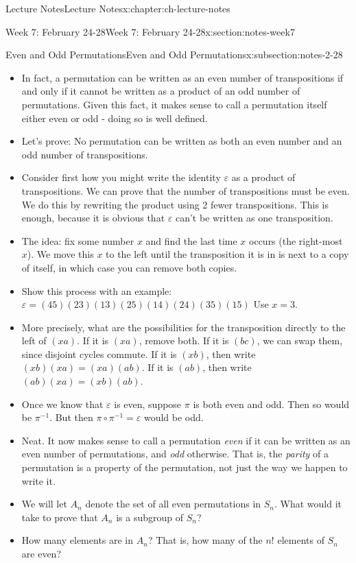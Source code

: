 \documentclass[oneside,11pt,]{book}
\begin{document}
\begin{chapterptx}{Lecture Notes}{}{Lecture Notes}{}{}{x:chapter:ch-lecture-notes}
\begin{sectionptx}{Week 7: February 24-28}{}{Week 7: February 24-28}{}{}{x:section:notes-week7}
\begin{subsectionptx}{Even and Odd Permutations}{}{Even and Odd Permutations}{}{}{x:subsection:notes-2-28}
\begin{itemize}[label=\textbullet]
\item{}In fact, a permutation can be written as an even number of transpositions if and only if it cannot be written as a product of an odd number of permutations. Given this fact, it makes sense to call a permutation itself either even or odd - doing so is well defined.%
\item{}Let’s prove: No permutation can be written as both an even number and an odd number of transpositions.%
\item{}Consider first how you might write the identity \(\varepsilon\) as a product of transpositions. We can prove that the number of transpositions must be even. We do this by rewriting the product using 2 fewer transpositions. This is enough, because it is obvious that \(\varepsilon\) can’t be written as one transposition.%
\item{}The idea: fix some number \(x\) and find the last time \(x\) occurs (the right-most \(x\)). We move this \(x\) to the left until the transposition it is in is next to a copy of itself, in which case you can remove both copies.%
\item{}Show this process with an example: \(\varepsilon = (45)(23)(13)(25)(14)(24)(35)(15)\) Use \(x = 3\).%
\item{}More precisely, what are the possibilities for the transposition directly to the left of \((xa)\). If it is \((xa)\), remove both. If it is \((bc)\), we can swap them, since disjoint cycles commute. If it is \((xb)\), then write \((xb)(xa) = (xa)(ab)\). If it is \((ab)\), then write \((ab)(xa) = (xb)(ab)\).%
\item{}Once we know that \(\varepsilon\) is even, suppose \(\pi\) is both even and odd. Then so would be \(\pi^{-1}\). But then \(\pi\circ \pi^{-1}= \varepsilon\) would be odd.%
\item{}Neat. It now makes sense to call a permutation \emph{even} if it can be written as an even number of permutations, and \emph{odd} otherwise. That is, the \emph{parity} of a permutation is a property of the permutation, not just the way we happen to write it.%
\item{}We will let \(A_n\) denote the set of all even permutations in \(S_n\). What would it take to prove that \(A_n\) is a subgroup of \(S_n\)?%
\item{}How many elements are in \(A_n\)? That is, how many of the \(n!\) elements of \(S_n\) are even?%

\end{itemize}
\end{subsectionptx}
\end{sectionptx}
\end{chapterptx}
\end{document}
